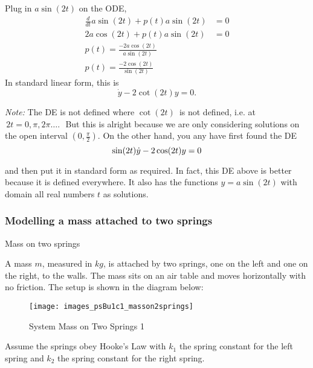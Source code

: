 Plug in $a \sin (2t)$ on the ODE,
\begin{align*}
  \frac{d}{dt} a\sin ⁡(2t) + p(t) a \sin ⁡(2t) &= 0\\
  2a \cos (2t) + p(t) a \sin ⁡(2t) &= 0 \\
  p(t) = \frac{-2a \cos (2t)}{a \sin ⁡(2t)} \\
  p(t) = \frac{-2 \cos (2t)}{\sin ⁡(2t)}
\end{align*}
In standard linear form, this is
\begin{equation*}
  \displaystyle  \dot{y}-2\cot (2t) y=0.
\end{equation*}

\emph{Note: } The DE is not defined where $\cot (2t)\,$ is not defined, i.e.
at $\, 2t=0,\pi , 2\pi \ldots .\, \,$ But this is alright
because  we are only considering solutions on the open interval $( 0, \frac{\pi}{2})$.
On the other hand, you any have first found the DE
\begin{equation*}
  \displaystyle  \displaystyle \sin (2t)\dot{y}-2\cos (2t) y=0
\end{equation*}

and then put it in standard form as required. In fact, this DE above is better because it is defined everywhere. It also has the functions $y= a\sin ⁡(2t)$ with domain all real numbers $t$ as solutions.

\clearpage

\subsubsection{Modelling a mass attached to two springs}

\begin{homework}
  Mass on two springs
\end{homework}

A mass $m$, measured in $kg$, is attached by two springs,
one on the left and one on the right, to the walls.
The mass sits on an air table and moves horizontally with no friction.
The setup is shown in the diagram below:
\begin{figure}[ht!]
  \centering
  \texttt{[image: images\_psBu1c1\_masson2springs]}
  \caption{System Mass on Two Springs 1}
\end{figure}

Assume the springs obey Hooke's Law with $k_ 1$ the spring constant
for the left spring and $k_2$ the spring constant for the right spring.\\

